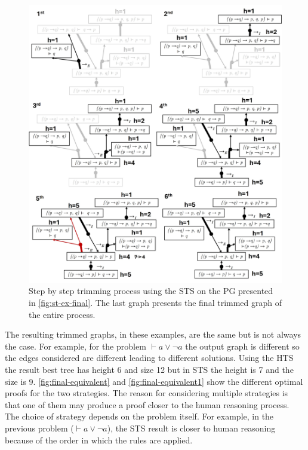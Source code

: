 \begin{figure}
    \centering
    \includegraphics[width=1\linewidth]{Chapters/Figures/trim-2-gen.jpg}
    \caption{Step by step trimming process using the STS on the PG presented in \autoref{fig:st-ex-final}. The last graph presents the final trimmed graph of the entire process.}
    \label{fig:sg-trim-size}
\end{figure}

\vspace{1em}

The resulting trimmed graphs, in these examples, are the same but is not always the case. For example, for the problem \(\vdash a \lor \lnot a\) the output graph is different so the edges considered are different leading to different solutions. Using the \gls{HTS} the result best tree has height 6 and size 12 but in \gls{STS} the height is 7 and the size is 9. \autoref{fig:final-equivalent} and \autoref{fig:final-equivalent1} show the different optimal proofs for the two strategies. The reason for considering multiple strategies is that one of them may produce a proof closer to the human reasoning process. The choice of strategy depends on the problem itself. For example, in the previous problem (\(\vdash a \lor \lnot a\)), the \gls{STS} result is closer to human reasoning because of the order in which the rules are applied.

